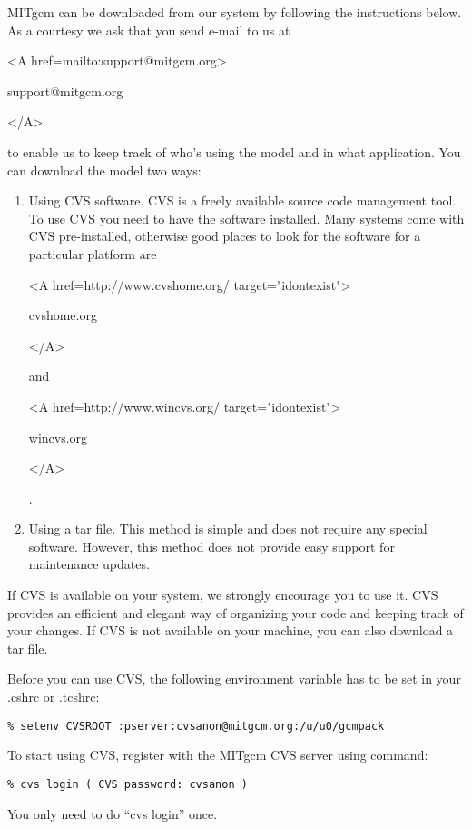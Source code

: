 MITgcm can be downloaded from our system by following
the instructions below. As a courtesy we ask that you send e-mail to us at
\begin{rawhtml} <A href=mailto:support@mitgcm.org> \end{rawhtml}
support@mitgcm.org
\begin{rawhtml} </A> \end{rawhtml}
to enable us to keep track of who's using the model and in what application.
You can download the model two ways:

\begin{enumerate}
\item Using CVS software. CVS is a freely available source code management
tool. To use CVS you need to have the software installed. Many systems
come with CVS pre-installed, otherwise good places to look for
the software for a particular platform are
\begin{rawhtml} <A href=http://www.cvshome.org/ target="idontexist"> \end{rawhtml}
cvshome.org
\begin{rawhtml} </A> \end{rawhtml}
and
\begin{rawhtml} <A href=http://www.wincvs.org/ target="idontexist"> \end{rawhtml}
wincvs.org
\begin{rawhtml} </A> \end{rawhtml}
.

\item Using a tar file. This method is simple and does not
require any special software. However, this method does not
provide easy support for maintenance updates.

\end{enumerate}

If CVS is available on your system, we strongly encourage you to use it. CVS
provides an efficient and elegant way of organizing your code and keeping
track of your changes. If CVS is not available on your machine, you can also
download a tar file.

Before you can use CVS, the following environment variable has to be set in
your .cshrc or .tcshrc:
\begin{verbatim}
% setenv CVSROOT :pserver:cvsanon@mitgcm.org:/u/u0/gcmpack
\end{verbatim}

To start using CVS, register with the MITgcm CVS server using command:
\begin{verbatim}
% cvs login ( CVS password: cvsanon )
\end{verbatim}
You only need to do ``cvs login'' once.

